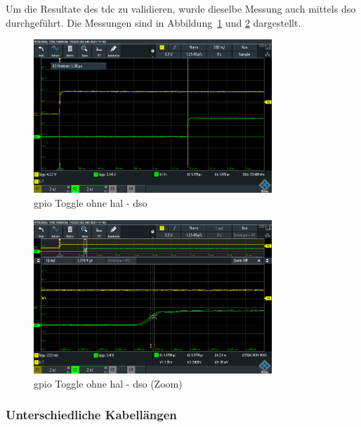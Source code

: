 \documentclass[11pt,a4paper,hidelinks]{article}
\begin{document}
Um die Resultate des \acrshort{tdc} zu validieren, wurde dieselbe Messung auch mittels \acrfull{dso} durchgeführt. Die
Messungen sind in Abbildung~\ref{fig:gpio_toggle_without_hal_dso} und \ref{fig:gpio_toggle_without_hal_dso_zoom}
dargestellt.

\begin{figure}[H]
    \centering
    \includegraphics[width=0.8\textwidth]{graphics/gpio_toggle_without_hal_dso.png}
    \caption{\acrshort{gpio} Toggle ohne \acrshort{hal} - \acrshort{dso}}\label{fig:gpio_toggle_without_hal_dso}
\end{figure}

\begin{figure}[H]
    \centering
    \includegraphics[width=0.8\textwidth]{graphics/gpio_toggle_without_hal_dso_zoom.png}
    \caption{\acrshort{gpio} Toggle ohne \acrshort{hal} - \acrshort{dso} (Zoom)}\label{fig:gpio_toggle_without_hal_dso_zoom}
\end{figure}

\subsubsection{Unterschiedliche Kabellängen}\label{sec:different_cable_lengths}
\end{document}
